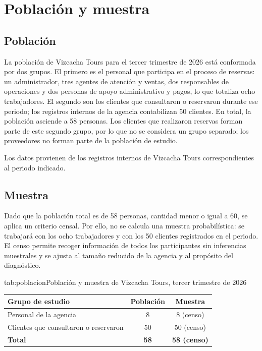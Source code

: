 \chapter{Población y muestra}
\label{cap:poblacion}

\section{Población}

La población de Vizcacha Tours para el tercer trimestre de 2026 está
conformada por dos grupos. El primero es el personal que participa en el
proceso de reservas: un administrador, tres agentes de atención y ventas, dos
responsables de operaciones y dos personas de apoyo administrativo y pagos, lo
que totaliza ocho trabajadores. El segundo son los clientes que consultaron o
reservaron durante ese periodo; los registros internos de la agencia
contabilizan 50 clientes. En total, la población asciende a 58 personas. Los
clientes que realizaron reservas forman parte de este segundo grupo, por lo
que no se considera un grupo separado; los proveedores no forman parte de la
población de estudio.

Los datos provienen de los registros internos de Vizcacha Tours
correspondientes al periodo indicado.

\section{Muestra}

Dado que la población total es de 58 personas, cantidad menor o igual a 60, se
aplica un criterio censal. Por ello, no se calcula una muestra probabilística:
se trabajará con los ocho trabajadores y con los 50 clientes registrados en el
periodo. El censo permite recoger información de todos los participantes sin
inferencias muestrales y se ajusta al tamaño reducido de la agencia y al
propósito del diagnóstico.

\begin{tablaapa}{tab:poblacion}{Población y muestra de Vizcacha Tours, tercer trimestre de 2026}
\begin{tabular}{@{}p{7.2cm}cc@{}}
\toprule
Grupo de estudio & Población & Muestra \\
\midrule
Personal de la agencia & 8 & 8 (censo) \\
Clientes que consultaron o reservaron & 50 & 50 (censo) \\
\midrule
\textbf{Total} & \textbf{58} & \textbf{58 (censo)} \\
\bottomrule
\end{tabular}
\end{tablaapa}
